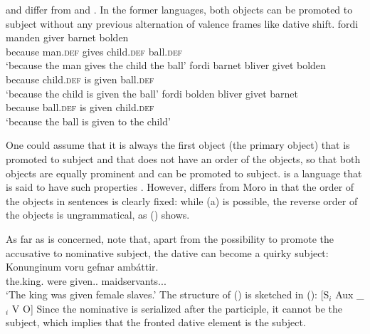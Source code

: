  and  differ from  and . In the former languages, both objects can be
promoted to subject without any previous alternation of valence frames like dative shift.
\eal
\ex\label{ex-fordi-manden-giver-barnet-bolden} 
\gll fordi manden giver barnet bolden\\ 
     because man.\textsc{def} gives child.\textsc{def} ball.\textsc{def}\\\danish
\glt `because the man gives the child the ball'
\ex\label{ex-child-was-given-ball-danish}
\gll fordi barnet bliver givet bolden\\ 
     because child.\textsc{def} is given ball.\textsc{def}\\
\glt `because the child is given the ball'
\ex\label{ex-ball-was-given-child-danish}
\gll fordi bolden bliver givet barnet\\ 
     because ball.\textsc{def} is given child.\textsc{def}\\
\glt `because the ball is given to the child'
\zl

\noindent
One could assume that it is always the first object (the primary object) that is promoted to subject
and that  does not have an order of the objects, so that both objects are equally prominent
and can be promoted to subject.  is a language that is said to have such properties
\citep{AMM2017a-u}. However,  differs from Moro in that the order of the objects in sentences is
clearly fixed: while (a) is possible, the reverse order of the objects is ungrammatical, as
() shows.
\z

\largerpage
\noindent
As far as  is concerned, \citet*[]{ZMT85a} note that, apart from the possibility to
promote the accusative to nominative subject, the dative can become a quirky subject:
\ea
\label{ex-dat-subj-passive-ditransitive-icelandic}
\gll Konunginum voru gefnar ambáttir.\\
     the.king.\DAT{} were given.\F.\PL{} maidservants.\NOM.\F.\PL\\\icelandic
\glt `The king was given female slaves.'
\z
The structure of () is sketched in ():
\ea
\label{sub-aux-v-o}
{}[S$_i$ Aux \_$_i$ V O] 
\z
Since the nominative is serialized after the participle, it cannot be the subject, which implies that
the fronted dative element is the subject.

